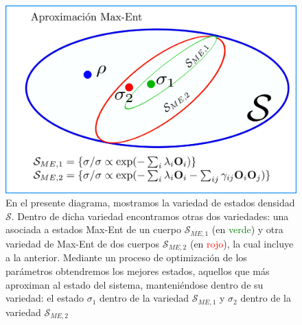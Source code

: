 \documentclass{report} %
\numberwithin{equation}{section}
\begin{document}
\begin{figure}
    \centering
    \includegraphics[scale=0.3]{figs/aprox-ME1_page-0001.jpg}
    \caption{En el presente diagrama, mostramos la variedad de estados densidad $\mathcal{S}$. Dentro de dicha variedad encontramos otras dos variedades: una asociada a estados Max-Ent de un cuerpo $\mathcal{S}_{ME,1}$ (en \textcolor{green}{verde}) y otra variedad de Max-Ent de dos cuerpos $\mathcal{S}_{ME,2}$ (en \textcolor{red}{rojo}), la cual incluye a la anterior. Mediante un proceso de optimización de los parámetros obtendremos los mejores estados, aquellos que más aproximan al estado del sistema, manteniéndose dentro de su variedad: el estado $\sigma_1$ dentro de la variedad $\mathcal{S}_{ME,1}$ y $\sigma_2$ dentro de la variedad $\mathcal{S}_{ME,2}$  }
    \label{aprox-ME1_page-0001.jpg}
\end{figure}
\end{document}

